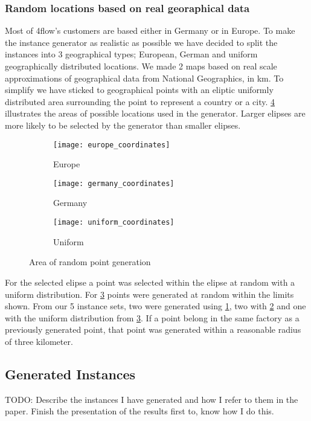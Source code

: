\documentclass[../main.tex]{subfiles}
\begin{document}
\subsubsection{Random locations based on real georaphical data}
Most of 4flow's customers are based either in Germany or in Europe. 
To make the instance generator as realistic as possible we have decided to split the instances into 3 geographical types; 
European, German and uniform geographically distributed locations.
We made 2 maps based on real scale approximations of geographical data from National Geographics, in km.
To simplify we have sticked to geographical points with an eliptic uniformly distributed area surrounding the point to represent a country or a city.
\ref{fig:areas} illustrates the areas of possible locations used in the generator. 
Larger elipses are more likely to be selected by the generator than smaller elipses.
\begin{figure}
\centering
    \begin{subfigure}[b]{0.3\textwidth}
        \centering
        \texttt{[image: europe\_coordinates]}
        \caption{Europe}
        \label{fig:eur}
    \end{subfigure}
    \hfill
    \begin{subfigure}[b]{0.3\textwidth}
        \centering
        \texttt{[image: germany\_coordinates]}
        \caption{Germany}
        \label{fig:ger}
    \end{subfigure}
    \hfill
    \begin{subfigure}[b]{0.3\textwidth}
        \centering
        \texttt{[image: uniform\_coordinates]}
        \caption{Uniform}
        \label{fig:uni}
    \end{subfigure}
    \caption{Area of random point generation}
    \label{fig:areas}
\end{figure}

For the selected elipse a point was selected within the elipse at random with a uniform distribution.
For \ref{fig:uni} points were generated at random within the limits shown.
From our 5 instance sets, two were generated using \ref{fig:eur}, two with \ref{fig:ger} and one with the uniform distribution from \ref{fig:uni}. 
If a point belong in the same factory as a previously generated point, that point was generated within a reasonable radius of three kilometer.

\subsection{Generated Instances}
\label{ssec:geni}
TODO: Describe the instances I have generated and how I refer to them in the paper. 
Finish the presentation of the results first to, know how I do this.
\end{document}

